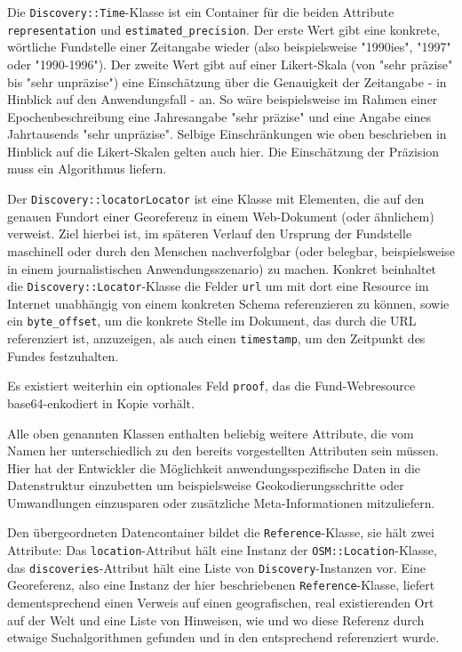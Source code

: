 Die \texttt{Discovery::Time}-Klasse ist ein Container für die beiden Attribute \texttt{representation} und \texttt{estimated\_precision}. Der erste Wert gibt eine konkrete, wörtliche Fundstelle einer Zeitangabe wieder (also beispielsweise "1990ies", "1997" oder "1990-1996"). Der zweite Wert gibt auf einer Likert-Skala (von "sehr präzise" bis "sehr unpräzise") eine Einschätzung über die Genauigkeit der Zeitangabe - in Hinblick auf den Anwendungsfall - an. So wäre beispielsweise im Rahmen einer Epochenbeschreibung eine Jahresangabe "sehr präzise" und eine Angabe eines Jahrtausends "sehr unpräzise". Selbige Einschränkungen wie oben beschrieben in Hinblick auf die Likert-Skalen gelten auch hier. Die Einschätzung der Präzision muss ein Algorithmus liefern.

Der \texttt{Discovery::locatorLocator} ist eine Klasse mit Elementen, die auf den genauen Fundort einer Georeferenz in einem Web-Dokument (oder ähnlichem) verweist. Ziel hierbei ist, im späteren Verlauf den Ursprung der Fundstelle maschinell oder durch den Menschen nachverfolgbar (oder belegbar, beispielsweise in einem journalistischen Anwendungsszenario) zu machen. Konkret beinhaltet die \texttt{Discovery::Locator}-Klasse die Felder \texttt{url} um mit dort eine Resource im Internet unabhängig von einem konkreten Schema referenzieren zu können, sowie ein \texttt{byte\_offset}, um die konkrete Stelle im Dokument, das durch die URL referenziert ist, anzuzeigen, als auch einen \texttt{timestamp}, um den Zeitpunkt des Fundes festzuhalten.
  
Es existiert weiterhin ein optionales Feld \texttt{proof}, das die Fund-Webresource base64-enkodiert in Kopie vorhält.

Alle oben genannten Klassen enthalten beliebig weitere Attribute, die vom Namen her unterschiedlich zu den bereits vorgestellten Attributen sein müssen. Hier hat der Entwickler die Möglichkeit anwendungsspezifische Daten in die Datenstruktur einzubetten um beispielsweise Geokodierungsschritte oder Umwandlungen einzusparen oder zusätzliche Meta-Informationen mitzuliefern.

Den übergeordneten Datencontainer bildet die \texttt{Reference}-Klasse, sie hält zwei Attribute: Das \texttt{location}-Attribut hält eine Instanz der \texttt{OSM::Location}-Klasse, das \texttt{discoveries}-Attribut hält eine Liste von \texttt{Discovery}-Instanzen vor. Eine Georeferenz, also eine Instanz der hier beschriebenen  \texttt{Reference}-Klasse, liefert dementsprechend einen Verweis auf einen geografischen, real existierenden Ort auf der Welt und eine Liste von Hinweisen, wie und wo diese Referenz durch etwaige Suchalgorithmen gefunden und in den entsprechend referenziert wurde.

